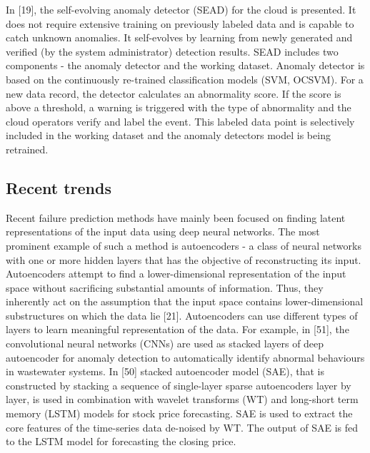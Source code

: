 \documentclass[]{usiinfprospectus}
\begin{document}
In [19], the self-evolving anomaly detector (SEAD) for the cloud is presented. It does not require extensive training on previously labeled data and is capable to catch unknown anomalies. It self-evolves by learning from newly generated and verified (by the system administrator) detection results. SEAD includes two components - the anomaly detector and the working dataset. Anomaly detector is based on the continuously re-trained classification models (SVM, OCSVM). For a new data record, the detector calculates an abnormality score. If the score is above a threshold, a warning is triggered with the type of abnormality and the cloud operators verify and label the event. This labeled data point is selectively included in the working dataset and the anomaly detectors model is being retrained.
%
%
%
\subsection{Recent trends}
Recent failure prediction methods have mainly been focused on finding latent representations of the input data using deep neural networks. The most prominent example of such a method is autoencoders - a class of neural networks with one or more hidden layers that has the objective of reconstructing its input. Autoencoders attempt to find a lower-dimensional representation of the input space without sacrificing substantial amounts of information. Thus, they inherently act on the assumption that the input space contains lower-dimensional substructures on which the data lie [21]. Autoencoders can use different types of layers to learn meaningful representation of the data. For example, in [51], the convolutional neural networks (CNNs) are used as stacked layers of deep autoencoder for  anomaly detection to automatically identify abnormal behaviours in wastewater systems. In [50] stacked autoencoder model (SAE), that is constructed by stacking a sequence of single-layer sparse autoencoders layer by layer, is used in combination with wavelet transforms (WT) and long-short term memory (LSTM) models for stock price forecasting. SAE is used to extract the core features of the time-series data de-noised by WT. The output of SAE is fed to the LSTM model for forecasting the closing price.\\\\
\end{document}
